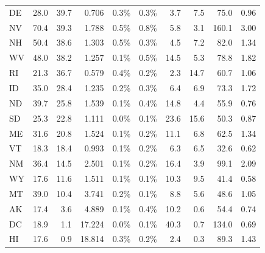 \begin{footnotesize}
\begin{singlespace}
\begin{longtable}{l r r r r r r r r r}
DE & 28.0 & 39.7 & 0.706 & 0.3\% & 0.3\% & 3.7 & 7.5 & 75.0 & 0.96 \\
NV & 70.4 & 39.3 & 1.788 & 0.5\% & 0.8\% & 5.8 & 3.1 & 160.1 & 3.00 \\
NH & 50.4 & 38.6 & 1.303 & 0.5\% & 0.3\% & 4.5 & 7.2 & 82.0 & 1.34 \\
WV & 48.0 & 38.2 & 1.257 & 0.1\% & 0.5\% & 14.5 & 5.3 & 78.8 & 1.82 \\
RI & 21.3 & 36.7 & 0.579 & 0.4\% & 0.2\% & 2.3 & 14.7 & 60.7 & 1.06 \\
ID & 35.0 & 28.4 & 1.235 & 0.2\% & 0.3\% & 6.4 & 6.9 & 73.3 & 1.72 \\
ND & 39.7 & 25.8 & 1.539 & 0.1\% & 0.4\% & 14.8 & 4.4 & 55.9 & 0.76 \\
SD & 25.3 & 22.8 & 1.111 & 0.0\% & 0.1\% & 23.6 & 15.6 & 50.3 & 0.87 \\
ME & 31.6 & 20.8 & 1.524 & 0.1\% & 0.2\% & 11.1 & 6.8 & 62.5 & 1.34 \\
VT & 18.3 & 18.4 & 0.993 & 0.1\% & 0.2\% & 6.3 & 6.5 & 32.6 & 0.62 \\
NM & 36.4 & 14.5 & 2.501 & 0.1\% & 0.2\% & 16.4 & 3.9 & 99.1 & 2.09 \\
WY & 17.6 & 11.6 & 1.511 & 0.1\% & 0.1\% & 10.3 & 9.5 & 41.4 & 0.58 \\
MT & 39.0 & 10.4 & 3.741 & 0.2\% & 0.1\% & 8.8 & 5.6 & 48.6 & 1.05 \\
AK & 17.4 & 3.6 & 4.889 & 0.1\% & 0.4\% & 10.2 & 0.6 & 54.4 & 0.74 \\
DC & 18.9 & 1.1 & 17.224 & 0.0\% & 0.1\% & 40.3 & 0.7 & 134.0 & 0.69 \\
HI & 17.6 & 0.9 & 18.814 & 0.3\% & 0.2\% & 2.4 & 0.3 & 89.3 & 1.43 \\
\end{longtable}
\end{singlespace}
\end{footnotesize}